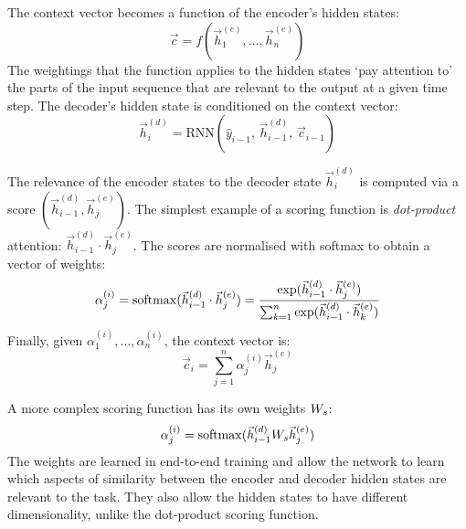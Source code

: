 The context vector becomes a function of the encoder's hidden states:
\begin{equation}
  \vec{c} = f(\vec{h}^{(e)}_1, \dots, \vec{h}^{(e)}_n)
\end{equation}
The weightings that the function applies to the hidden states `pay attention
to' the parts of the input sequence that are relevant to the output at a given
time step.
The decoder's hidden state is conditioned on the context vector:
\begin{equation}
  \vec{h}^{(d)}_i = \text{RNN}(\hat{y}_{i - 1},\, \vec{h}^{(d)}_{i - 1},\, \vec{c}_{i - 1})
\end{equation}

The relevance of the encoder states to the decoder state $\vec{h}^{(d)}_i$ is
computed via a score $(\vec{h}^{(d)}_{i - 1}, \vec{h}^{(e)}_j)$.
The simplest example of a scoring function is \textit{dot-product} attention:
$\vec{h}^{(d)}_{i - 1} \cdot \vec{h}^{(e)}_j$.
The scores are normalised with softmax to obtain a vector of weights:
\begin{equation}
  \alpha^{(i)}_j
  = \operatorname{softmax}(\vec{h}^{(d)}_{i - 1} \cdot \vec{h}^{(e)}_j)
  = \frac{\exp(\vec{h}^{(d)}_{i - 1} \cdot \vec{h}^{(e)}_j)}{\sum_{k = 1}^n \exp(\vec{h}^{(d)}_{i - 1} \cdot \vec{h}^{(e)}_k)}
\end{equation}
Finally, given $\alpha^{(i)}_1, \dots, \alpha^{(i)}_n$, the context vector is:
\begin{equation}
  \vec{c}_i = \sum_{j = 1}^n \alpha^{(i)}_j \vec{h}^{(e)}_j
\end{equation}

A more complex scoring function has its own weights $W_{s}$:
\begin{equation}
  \alpha^{(i)}_j = \operatorname{softmax}(\vec{h}^{(d)}_{i - 1} W_{s} \vec{h}^{(e)}_j)
\end{equation}
The weights are learned in end-to-end training and allow the network to learn
which aspects of similarity between the encoder and decoder hidden states are
relevant to the task.
They also allow the hidden states to have different dimensionality, unlike the
dot-product scoring function.
